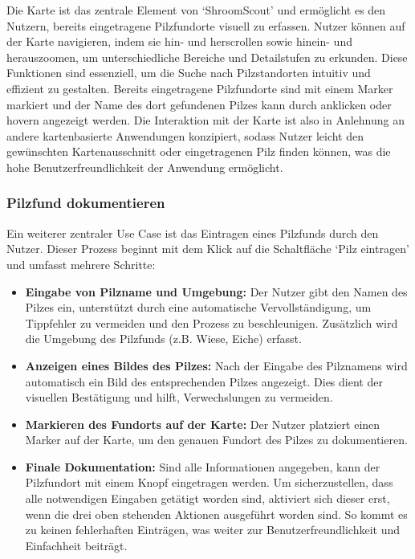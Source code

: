 \documentclass[../main.tex]{subfiles} %
\begin{document}
Die Karte ist das zentrale Element von `ShroomScout' und ermöglicht es den Nutzern, bereits eingetragene Pilzfundorte
visuell zu erfassen. Nutzer können auf der Karte navigieren, indem sie hin- und herscrollen sowie hinein- und herauszoomen,
um unterschiedliche Bereiche und Detailstufen zu erkunden. Diese Funktionen sind essenziell, um die Suche nach Pilzstandorten
intuitiv und effizient zu gestalten. Bereits eingetragene Pilzfundorte sind mit einem Marker markiert und der Name des dort
gefundenen Pilzes kann durch anklicken oder hovern angezeigt werden. Die Interaktion mit der Karte ist also in Anlehnung an
andere kartenbasierte Anwendungen konzipiert, sodass Nutzer leicht den gewünschten Kartenausschnitt oder eingetragenen Pilz
finden können, was die hohe Benutzerfreundlichkeit der Anwendung ermöglicht.

\subsubsection{Pilzfund dokumentieren}

Ein weiterer zentraler Use Case ist das Eintragen eines Pilzfunds durch den Nutzer. Dieser Prozess beginnt mit dem Klick
auf die Schaltfläche `Pilz eintragen' und umfasst mehrere Schritte:

\begin{itemize}

	\item \textbf{Eingabe von Pilzname und Umgebung:}
	      Der Nutzer gibt den Namen des Pilzes ein, unterstützt durch eine automatische Vervollständigung, um Tippfehler zu
	      vermeiden und den Prozess zu beschleunigen. Zusätzlich wird die Umgebung des Pilzfunds (z.B. Wiese, Eiche) erfasst.

	\item \textbf{Anzeigen eines Bildes des Pilzes:}
	      Nach der Eingabe des Pilznamens wird automatisch ein Bild des entsprechenden Pilzes angezeigt. Dies dient der visuellen
	      Bestätigung und hilft, Verwechslungen zu vermeiden.

	\item \textbf{Markieren des Fundorts auf der Karte:}
	      Der Nutzer platziert einen Marker auf der Karte, um den genauen Fundort des Pilzes zu dokumentieren.

	\item \textbf{Finale Dokumentation:}
	      Sind alle Informationen angegeben, kann der Pilzfundort mit einem Knopf eingetragen werden. Um sicherzustellen, dass alle
	      notwendigen Eingaben getätigt worden sind, aktiviert sich dieser erst, wenn die drei oben stehenden Aktionen ausgeführt
	      worden sind. So kommt es zu keinen fehlerhaften Einträgen, was weiter zur Benutzerfreundlichkeit und Einfachheit beiträgt.

\end{itemize}
\end{document}
